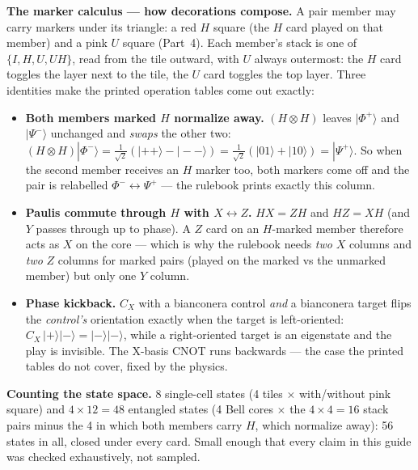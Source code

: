 \documentclass[a4paper,11pt]{article}
\providecommand{\ket}[1]{|#1\rangle}
\begin{document}
\begin{deepdivebox}
\textbf{The marker calculus --- how decorations compose.} A pair member may carry
markers under its triangle: a red $H$ square (the $H$ card played on that member) and a
pink $U$ square (Part~4). Each member's stack is one of $\{I, H, U, UH\}$, read from the
tile outward, with $U$ always outermost: the $H$ card toggles the layer next to the
tile, the $U$ card toggles the top layer. Three identities make the printed operation
tables come out exactly:
\begin{itemize}
    \item \textbf{Both members marked $H$ normalize away.} $(H \otimes H)$ leaves
          $\ket{\Phi^+}$ and $\ket{\Psi^-}$ unchanged and \emph{swaps} the other two:
          $(H \otimes H)\ket{\Phi^-} = \tfrac{1}{\sqrt 2}(\ket{{+}{+}} - \ket{{-}{-}})
          = \tfrac{1}{\sqrt 2}(\ket{01} + \ket{10}) = \ket{\Psi^+}$. So when the second
          member receives an $H$ marker too, both markers come off and the pair is
          relabelled $\Phi^- \leftrightarrow \Psi^+$ --- the rulebook prints exactly this
          column.
    \item \textbf{Paulis commute through $H$ with $X \leftrightarrow Z$.} $HX = ZH$ and
          $HZ = XH$ (and $Y$ passes through up to phase). A $Z$ card on an $H$-marked
          member therefore acts as $X$ on the core --- which is why the rulebook needs
          \emph{two} $X$ columns and \emph{two} $Z$ columns for marked pairs (played on
          the marked vs the unmarked member) but only one $Y$ column.
    \item \textbf{Phase kickback.} $C_X$ with a bianconera control \emph{and} a
          bianconera target flips the \emph{control's} orientation exactly when the
          target is left-oriented: $C_X\,\ket{+}\ket{-} = \ket{-}\ket{-}$, while a
          right-oriented target is an eigenstate and the play is invisible. The X-basis
          CNOT runs backwards --- the case the printed tables do not cover, fixed by the
          physics.
\end{itemize}
\textbf{Counting the state space.} 8 single-cell states (4 tiles $\times$ with/without
pink square) and $4 \times 12 = 48$ entangled states (4 Bell cores $\times$ the
$4 \times 4 = 16$ stack pairs minus the 4 in which both members carry $H$, which
normalize away): 56 states in all, closed under every card. Small enough that every
claim in this guide was checked exhaustively, not sampled.
\end{deepdivebox}
\end{document}

